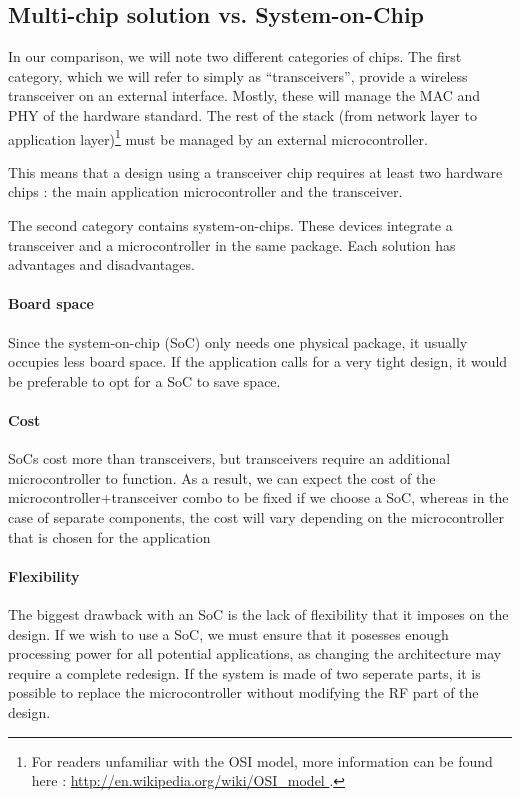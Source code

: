 \subsection{Multi-chip solution vs. System-on-Chip}

In our comparison, we will note two different categories of chips. The first
category, which we will refer to simply as ``transceivers'', provide a wireless
transceiver on an external interface. Mostly, these will manage the MAC and PHY
of the hardware standard. The rest of the stack (from network layer to
application layer)\footnote{For readers unfamiliar with the OSI model, more
information can be found here : \url{ http://en.wikipedia.org/wiki/OSI_model }.}
must be managed by an external microcontroller. 

This means that a design using a transceiver chip requires at least two hardware
chips : the main application microcontroller and the transceiver.

The second category contains system-on-chips. These devices integrate
a transceiver and a microcontroller in the same package. Each solution has
advantages and disadvantages.

\paragraph{Board space} 

Since the system-on-chip (SoC) only needs one physical package, it usually
occupies less board space. If the application calls for a very tight design, it
would be preferable to opt for a SoC to save space.

\paragraph{Cost} 

SoCs cost more than transceivers, but transceivers require an additional
microcontroller to function. As a result, we can expect the cost of the
microcontroller+transceiver combo to be fixed if we choose a SoC, whereas in the
case of separate components, the cost will vary depending on the microcontroller
that is chosen for the application

\paragraph{Flexibility} 

The biggest drawback with an SoC is the lack of flexibility that it imposes on
the design. If we wish to use a SoC, we must ensure that it posesses enough
processing power for all potential applications, as changing the architecture
may require a complete redesign.  If the system is made of two seperate parts,
it is possible to replace the microcontroller without modifying the RF part of
the design.

